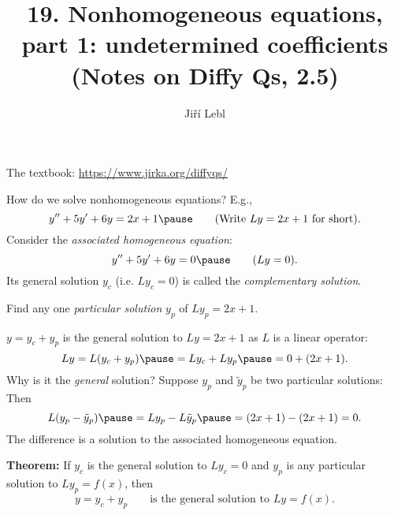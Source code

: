 \documentclass[10pt,aspectratio=169]{beamer}
\author{Ji\v{r}\'i Lebl}
\institute[OSU]{%
Oklahoma State University%
}
\title{19. Nonhomogeneous equations,\\part 1: undetermined coefficients\\(Notes on Diffy Qs, 2.5)}
\date{}
\begin{document}
\begin{frame}
\titlepage


\begin{center}
The textbook: \url{https://www.jirka.org/diffyqs/}
\end{center}
\end{frame}

\begin{frame}
How do we solve nonhomogeneous equations?  E.g.,
\[
y'' + 5y'+ 6y = 2x+1
\pause
\qquad
\text{(Write $Ly = 2x+1$ for short).}
\]
\pause
Consider the \emph{associated homogeneous equation}:
\[
y'' + 5y'+ 6y = 0
\pause
\qquad
\text{($Ly = 0$).}
\]
\pause
Its general solution $y_c$ (i.e. $Ly_c = 0$) is called the
\emph{complementary solution}.

\medskip
\pause

Find any one \emph{particular solution} $y_p$ of $Ly_p=2x+1$.

\medskip
\pause

$y = y_c + y_p$ \quad is the general solution to $Ly=2x+1$
as $L$ is a linear operator:
\pause
\[
L y = L ( y_c + y_p) \pause = L y_c + L y_p \pause = 0 + (2x+1).
\]
\pause
Why is it the \emph{general} solution?
Suppose
$y_p$ and $\tilde{y}_p$ be two particular solutions:
Then
\[
L(y_p-\tilde{y}_p) \pause =
Ly_p-L\tilde{y}_p \pause =
(2x+1)-(2x+1) = 0 .
\]
\pause
The difference is a solution to the
associated homogeneous equation.

\medskip
\pause

\textbf{Theorem:} If $y_c$ is the general solution to $Ly_c = 0$
and $y_p$ is any particular solution to $Ly_p = f(x)$, then
\[
y=y_c+y_p
\qquad
\text{is the general solution to $Ly = f(x)$.}
\]
\end{frame}
\end{document}
